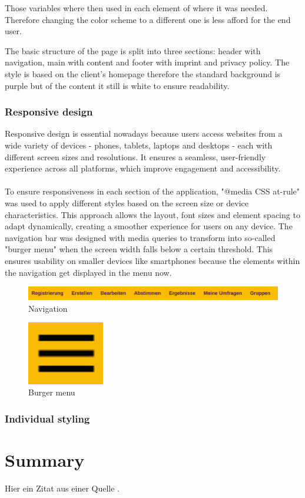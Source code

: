 \documentclass[a4paper,12pt]{report}
\begin{document}
Those variables where then used in each element of where it was needed. Therefore changing the color scheme to a different one is less afford for the end user.

The basic structure of the page is split into three sections: header with navigation, main with content and footer with imprint and privacy policy. The style is based on the client's homepage therefore the standard background is purple but of the content it still is white to ensure readability. \parencite{lmppage}

\subsection{Responsive design}
Responsive design is essential nowadays because users access websites from a wide variety of devices - phones, tablets, laptops and desktops - each with different screen sizes and resolutions. It ensures a seamless, user-friendly experience across all platforms, which improve engagement and accessibility.\\ \\
To ensure responsiveness in each section of the application, "@media CSS at-rule" was used to apply different styles based on the screen size or device characteristics. This approach allows the layout, font sizes and element spacing to adapt dynamically, creating a smoother experience for users on any device. The navigation bar was designed with media queries to transform into so-called "burger menu" when the screen width falls below a certain threshold. This ensures usability on smaller devices like smartphones because the elements within the navigation get displayed in the menu now.
\begin{figure}[h!]
	\centering
	\includegraphics[width=1\textwidth]{pics/navigation.png}
	\caption{Navigation}
	\label{fig:navigation}
\end{figure}
\begin{figure}[H]
	\centering
	\includegraphics[width=0.3\textwidth]{pics/burger_menu.png}
	\caption{Burger menu}
	\label{fig:burger_menu}
\end{figure}
\subsection{Individual styling}

\chapter{Summary}
\lipsum[1]

Hier ein Zitat aus einer Quelle \cite{author2023example}.



\printbibliography

\listoffigures
\newpage
\end{document}
